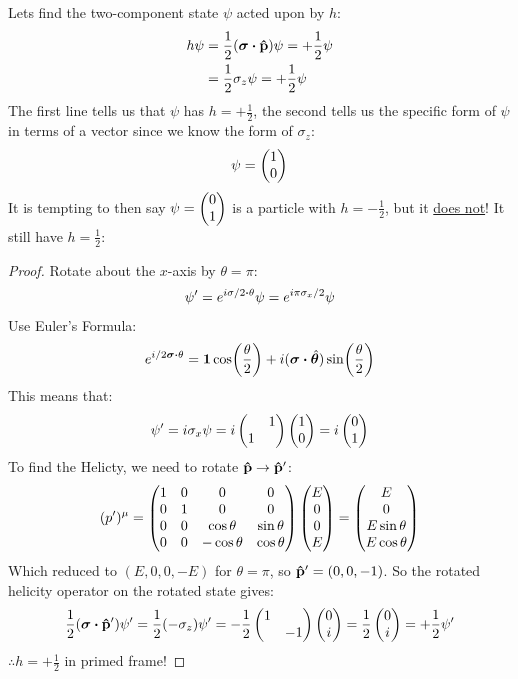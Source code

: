Lets find the two-component state $\psi$ acted upon by $h$:
\begin{align*}
  h\psi&=\frac12(\bm{\sigma}\vdot\vu{p})\psi=+\frac12\psi\\
  &=\frac12\sigma_z\psi=+\frac12\psi
\end{align*}
The first line tells us that $\psi$ has $h=+\frac12$, the second tells us the specific form of $\psi$ in terms of a vector since we know the form of $\sigma_z$:
\begin{align*}
  \psi=\pmqty{1\\0}
\end{align*}
It is tempting to then say $\psi=\pmqty{0\\1}$ is a particle with $h=-\frac12$, but it \underline{does not}! It still have $h=\frac12$:
\begin{proof}
  Rotate about the $x$-axis by $\theta=\pi$:
  \begin{align*}
    \psi'=e^{i\sigma/2\vdot\theta}\psi=e^{i\pi\sigma_x/2}\psi
  \end{align*}
  Use Euler's Formula:
  \begin{align*}
    e^{i/2\bm{\sigma}\vdot\theta}=\bm{1}\cos(\frac\theta2)+
    i(\bm{\sigma}\vdot\hat{\bm{\theta}})\sin(\frac\theta2)
  \end{align*}
  This means that:
  \begin{align*}
    \psi'=i\sigma_x\psi=i\pmqty{&1\\1}\pmqty{1\\0}=i\pmqty{0\\1}
  \end{align*}
  To find the Helicty, we need to rotate $\vu{p}\to\vu{p}'$:
  \begin{align*}
    (p')^\mu=\pmqty{
      1&0&0&0\\
      0&1&0&0\\
      0&0&\cos\theta&\sin\theta\\
      0&0&-\cos\theta&\cos\theta
    }
    \pmqty{E\\0\\0\\E}=\pmqty{E\\0\\E\sin\theta\\E\cos\theta}
  \end{align*}
  Which reduced to $(E,0,0,-E)$ for $\theta=\pi$, so $\vu{p}'=(0,0,-1)$. So the rotated helicity operator on the rotated state gives:
  \begin{align*}
    \frac12(\bm{\sigma}\vdot\vu{p}')\psi'=\frac12(-\sigma_z)\psi'
    =-\frac12\pmqty{1\\&-1}\pmqty{0\\i}=\frac12\pmqty{0\\i}=+\frac12\psi'
  \end{align*}
  $\therefore h=+\frac12$ in primed frame!
\end{proof}

